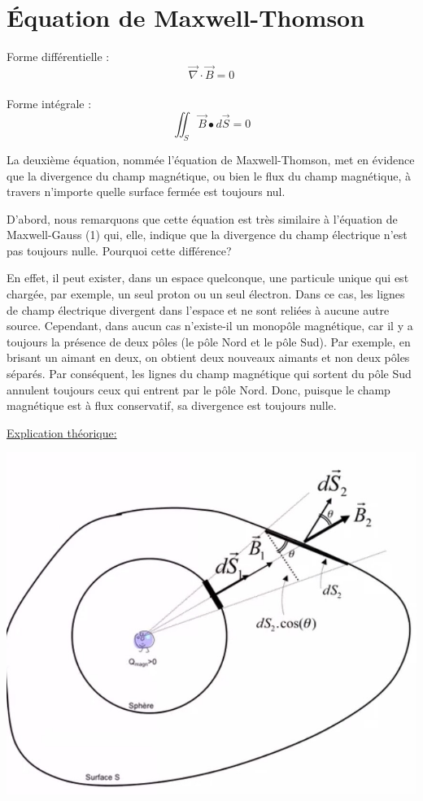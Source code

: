 \documentclass[12pt]{article}
\begin{document}
\newpage\section*{Équation de Maxwell-Thomson}

Forme différentielle : $$\vec{\nabla} \cdot \vec{B} = 0$$\\

Forme intégrale : $$\iint_S \vec{B} \bullet d\vec{S} = 0$$

\noindent La deuxième équation, nommée l'équation de Maxwell-Thomson, met en évidence que la divergence du champ magnétique, ou bien le flux du champ magnétique, à travers n'importe quelle surface fermée est toujours nul.

\noindent D'abord, nous remarquons que cette équation est très similaire à l'équation de Maxwell-Gauss (1) qui, elle, indique que la divergence du champ électrique n'est pas toujours nulle. Pourquoi cette différence? 

\noindent En effet, il peut exister, dans un espace quelconque, une particule unique qui est chargée, par exemple, un seul proton ou un seul électron. Dans ce cas, les lignes de champ électrique divergent dans l'espace et ne sont reliées à aucune autre source. Cependant, dans aucun cas n'existe-il un monopôle magnétique, car il y a toujours la présence de deux pôles (le pôle Nord et le pôle Sud). Par exemple, en brisant un aimant en deux, on obtient deux nouveaux aimants et non deux pôles séparés. Par conséquent, les lignes du champ magnétique qui sortent du pôle Sud annulent toujours ceux qui entrent par le pôle Nord. Donc, puisque le champ magnétique est à flux conservatif, sa divergence est toujours nulle. 

\noindent \underline{Explication théorique:}

\includegraphics[scale=0.4]{Pictures/image.jpg}
\end{document}
